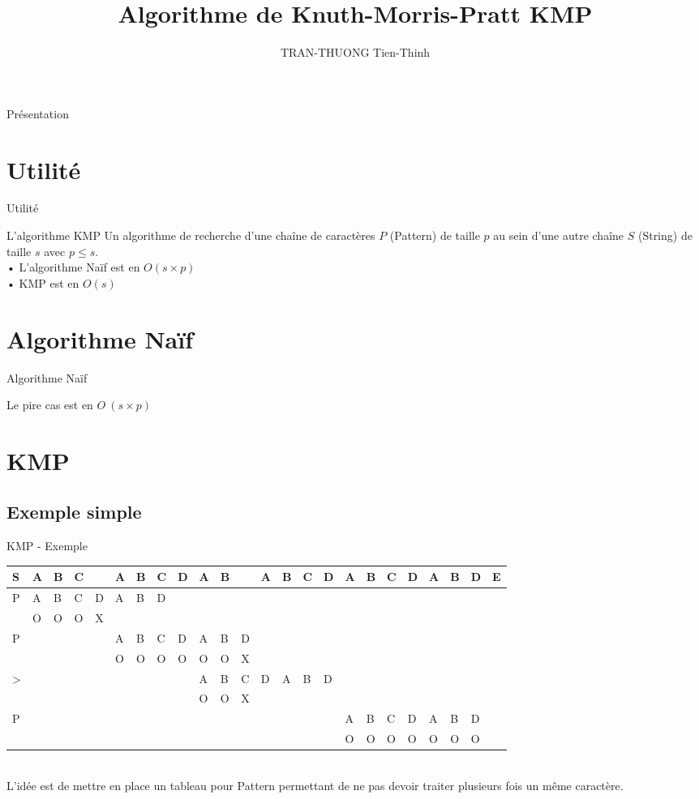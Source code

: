 \documentclass[12pt]{beamer}
\author{TRAN-THUONG Tien-Thinh}
\title{Algorithme de Knuth-Morris-Pratt KMP}
\begin{document}
\begin{frame}
\titlepage
\end{frame}

\begin{frame}{Présentation}
\tableofcontents
\end{frame}

\section{Utilité}
\begin{frame}{Utilité}
\begin{block}{L'algorithme KMP}
Un algorithme de recherche d'une chaîne de caractères $P$ (Pattern) de taille $p$ au sein d'une autre chaîne $S$ (String) de taille $s$ avec $p \leq s$. \\
• L'algorithme Naïf est en $O(s \times p) $ \\
• KMP est en $O(s) $
\end{block}
\end{frame}

\section{Algorithme Naïf}
\begin{frame}{Algorithme Naïf}

Le pire cas est en $O\ (s \times p)$
\end{frame}

\section{KMP}
\subsection{Exemple simple}
\begin{frame}{KMP - Exemple}
\begin{tabular}{ l || p{0.01cm}p{0.01cm}p{0.01cm}p{0.01cm}p{0.01cm}p{0.01cm}p{0.01cm}p{0.01cm}p{0.01cm}p{0.01cm}p{0.01cm}p{0.01cm}p{0.01cm}p{0.01cm}p{0.01cm}p{0.01cm}p{0.01cm}p{0.01cm}p{0.01cm}p{0.01cm}p{0.01cm}p{0.01cm}p{0.01cm}} 
   S  &A&B&C& &A&B&C&D&A&B& &A&B&C&D&A&B&C&D&A&B&D&E \\ \hline
   P  &A&B&C&D&A&B&D  \\ 
      &O&O&O&X \\ \hline
   P  & & & & &A&B&C&D&A&B&D \\
   	  & & & & &O&O&O&O&O&O&X \\
   >  & & & & & & & & &A&B&C&D&A&B&D \\
   	  & & & & & & & & &O&O&X \\ \hline
   P  & & & & & & & & & & & & & & & &A&B&C&D&A&B&D \\
      & & & & & & & & & & & & & & & &O&O&O&O&O&O&O  
\end{tabular} \\
L'idée est de mettre en place un tableau pour Pattern permettant de ne pas devoir traiter plusieurs fois un même caractère.
\end{frame}
\end{document}
